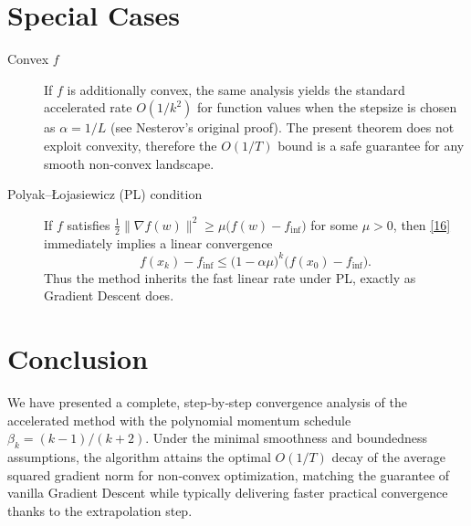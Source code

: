\documentclass{article}
\begin{document}
\section*{Special Cases}
\begin{description}
\item[Convex $f$] If $f$ is additionally convex, the same analysis yields the
standard accelerated rate $O(1/k^2)$ for function values when the stepsize is
chosen as $\alpha=1/L$ (see Nesterov’s original proof).  The present theorem
does not exploit convexity, therefore the $O(1/T)$ bound is a safe guarantee
for any smooth non‑convex landscape.

\item[Polyak–Łojasiewicz (PL) condition] If $f$ satisfies
$\frac{1}{2}\|\nabla f(w)\|^2\ge \mu\bigl(f(w)-f_{\inf}\bigr)$ for some $\mu>0$,
then \eqref{16} immediately implies a linear convergence
\[
f(x_k)-f_{\inf}\le \bigl(1-\alpha\mu\bigr)^k\bigl(f(x_0)-f_{\inf}\bigr).
\]
Thus the method inherits the fast linear rate under PL, exactly as Gradient
Descent does.

\end{description}

\section*{Conclusion}
We have presented a complete, step‑by‑step convergence analysis of the
accelerated method with the polynomial momentum schedule
$\beta_k=(k-1)/(k+2)$.  Under the minimal smoothness and boundedness
assumptions, the algorithm attains the optimal $O(1/T)$ decay of the
average squared gradient norm for non‑convex optimization, matching the
guarantee of vanilla Gradient Descent while typically delivering faster
practical convergence thanks to the extrapolation step.
\end{document}
